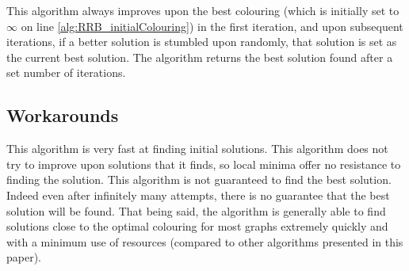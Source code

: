 This algorithm always improves upon the best colouring (which is initially set to $\infty$ on line \ref{alg:RRB_initialColouring}) in the first iteration, and upon subsequent iterations, if a better solution is stumbled upon randomly, that solution is set as the current best solution. The algorithm returns the best solution found after a set number of iterations. 

\subsection{Workarounds}
This algorithm is very fast at finding initial solutions. This algorithm does not try to improve upon solutions that it finds, so local minima offer no resistance to finding the solution. This algorithm is not guaranteed to find the best solution. Indeed even after infinitely many attempts, there is no guarantee that the best solution will be found. That being said, the algorithm is generally able to find solutions close to the optimal colouring for most graphs extremely quickly and with a minimum use of resources (compared to other algorithms presented in this paper).
